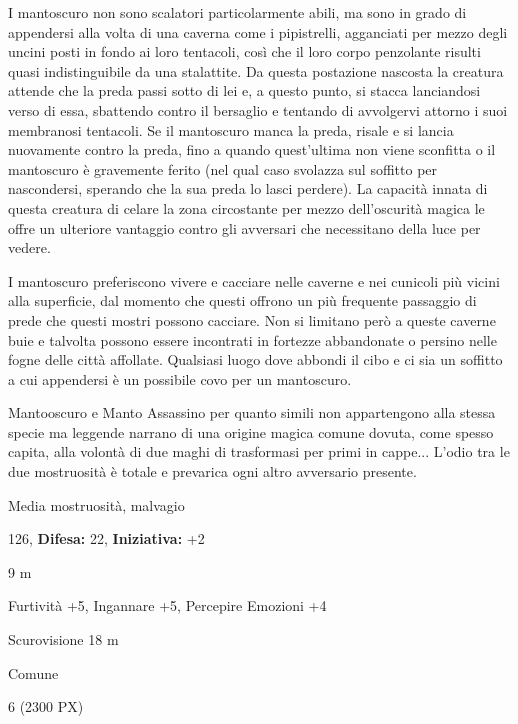 \begin{multicols}{2}
{I mantoscuro non sono scalatori particolarmente abili, ma sono in grado di appendersi alla volta di una caverna come i pipistrelli, agganciati per mezzo degli uncini posti in fondo ai loro tentacoli, così che il loro corpo penzolante risulti quasi indistinguibile da una stalattite. Da questa postazione nascosta la creatura attende che la preda passi sotto di lei e, a questo punto, si stacca lanciandosi verso di essa, sbattendo contro il bersaglio e tentando di avvolgervi attorno i suoi membranosi tentacoli. Se il mantoscuro manca la preda, risale e si lancia nuovamente contro la preda, fino a quando quest'ultima non viene sconfitta o il mantoscuro è gravemente ferito (nel qual caso svolazza sul soffitto per nascondersi, sperando che la sua preda lo lasci perdere). La capacità innata di questa creatura di celare la zona circostante per mezzo dell'oscurità magica le offre un ulteriore vantaggio contro gli avversari che necessitano della luce per vedere.

I mantoscuro preferiscono vivere e cacciare nelle caverne e nei cunicoli più vicini alla superficie, dal momento che questi offrono un più frequente passaggio di prede che questi mostri possono cacciare. Non si limitano però a queste caverne buie e talvolta possono essere incontrati in fortezze abbandonate o persino nelle fogne delle città affollate. Qualsiasi luogo dove abbondi il cibo e ci sia un soffitto a cui appendersi è un possibile covo per un mantoscuro.

Mantooscuro e Manto Assassino per quanto simili non appartengono alla stessa specie ma leggende narrano di una origine magica comune dovuta, come spesso capita, alla volontà di due maghi di trasformasi per primi in cappe... L'odio tra le due mostruosità è totale e prevarica ogni altro avversario presente.

\noindent
\begin{description}[noitemsep, topsep=0pt, parsep=0pt, partopsep=0pt, leftmargin=0cm, labelwidth=2.2cm]
	\item[\textbf{Taglia/Tipo:}] Media mostruosità, malvagio
	\item[\textbf{Caratt.:}] 
	\item[\textbf{Punti Ferita:}] 126,  \textbf{Difesa:} 22,  \textbf{Iniziativa:} +2
	\item[\textbf{Movimento:}] 9 m
	\item[\textbf{Tiri Salvez.:}] 
	\item[\textbf{Comp.:}] Furtività +5, Ingannare +5, Percepire Emozioni +4
	\item[\textbf{Sensi:}] Scurovisione 18 m
	\item[\textbf{Linguaggi:}] Comune
	\item[\textbf{Sfida:}] 6 (2300 PX)\smallskip
\end{description}

}
\end{multicols}
